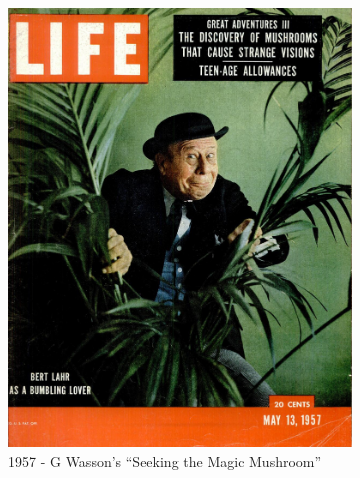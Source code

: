 \documentclass{UIdahoMastersThesis}
\begin{document}
\begin{figure}
  \centering
  \begin{subfigure}[b]{0.4\linewidth}
    \includegraphics[width=\linewidth]{life57.png}
    \caption{1957 - G Wasson's ``Seeking the Magic Mushroom''}
  \end{subfigure}
  \begin{subfigure}[b]{0.4\linewidth}

\end{subfigure}
\end{figure}
\end{document}
